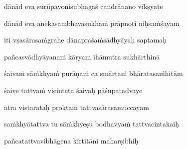 \nemslokac 
dānād eva surūpayonisubhagaś candrānano vīkṣyate
\dontdisplaylinenum

\nemslokad 
dānād eva anekasambhavasukha\.m prāpnoti niḥsa\.mśayam \veg\dontdisplaylinenum

\vers


\jump
\begin{center}
\ketdanda iti vṣasārasa\.mgrahe dānapraśa\.msādhyāyaḥ saptamaḥ\ketdanda
\end{center}
\dontdisplaylinenum\vers 
\bekveg\szamveg\vfill\phpspagebreak\szam\bek{}
\thispagestyle{empty}



\jump\jump

\vers

pañcasvādhyāyana\.m kāryam ihāmutra sukhārthinā\thinspace{\dandab} \dontdisplaylinenum

śaiva\.m sā\.mkhya\.m purāṇa\.m ca smārta\.m bhāratasa\.mhitām \veg\dontdisplaylinenum

śaive tattva\.m vicinteta śaivaḥ pāśupatadvaye\thinspace{\dandab} \dontdisplaylinenum

atra vistarataḥ prokta\.m tattvasārasamuccayam \veg\dontdisplaylinenum

sa\.mkhyātattva tu sā\.mkhyeṣu bodhavya\.m tattvacintakaiḥ\thinspace{\dandab} \dontdisplaylinenum

pañcatattvavibhāgena kīrtitāni maharṣibhiḥ \veg\dontdisplaylinenum

